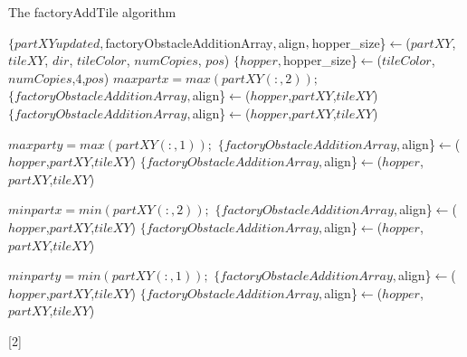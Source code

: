 \documentclass[letterpaper, 10 pt, conference]{ieeeconf}
\begin{document}
\begin{algorithm} 
\newcommand\algotext[2]{\end{algorithmic}#2\begin{algorithmic}[2]}
\scriptsize
\caption{The factoryAddTile algorithm}
\begin{algorithmic}[2]
\State$\{partXYupdated, $factoryObstacleAdditionArray$, $align$, \newline$hopper_size\}$\leftarrow${}(\newline$partXY$, $tileXY$, $dir$, $tileColor$, $numCopies$, $pos$)
\State$\{ hopper,$hopper_size\}$\leftarrow${}(\newline$tileColor$,$numCopies$,$4$,$pos$)
$maxpartx=max(partXY(:,2));$
\State$\{factoryObstacleAdditionArray, $align\}$\leftarrow${}(\newline$hopper$,$partXY$,$tileXY$)
\Else
\State$\{factoryObstacleAdditionArray, $align\}$\leftarrow${}(\newline$hopper$,$partXY$,$tileXY$)
\EndIf
\EndIf

$maxparty=max(partXY(:,1));$
\State$\{factoryObstacleAdditionArray, $align\}$\leftarrow${}(\newline$hopper$,$partXY$,$tileXY$)
\Else
\State$\{factoryObstacleAdditionArray, $align\}$\leftarrow${}(\newline$hopper$,$partXY$,$tileXY$)
\EndIf
\EndIf


$minpartx=min(partXY(:,2));$
\State$\{factoryObstacleAdditionArray, $align\}$\leftarrow${}(\newline$hopper$,$partXY$,$tileXY$)
\Else
\State$\{factoryObstacleAdditionArray, $align\}$\leftarrow${}(\newline$hopper$,$partXY$,$tileXY$)
\EndIf
\EndIf


$minparty=min(partXY(:,1));$
\State$\{factoryObstacleAdditionArray, $align\}$\leftarrow${}(\newline$hopper$,$partXY$,$tileXY$)
\Else
\State$\{factoryObstacleAdditionArray, $align\}$\leftarrow${}(\newline$hopper$,$partXY$,$tileXY$)
\EndIf
\EndIf
\end{algorithmic}[2]
\end{algorithm}
 
 
 
\end{document}
